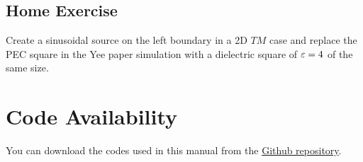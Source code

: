 \documentclass[11pt]{article}
\begin{document}
\subsection*{Home Exercise}

\begin{mdframed}[backgroundcolor=blue!20]
  Create a sinusoidal source on the left boundary in a 2D $TM$ case and replace the PEC square in the Yee paper simulation with a dielectric square of $\varepsilon = 4$ of the same size.
\end{mdframed}

\section{Code Availability}

You can download the codes used in this manual from the \href{https://github.com/hasantahir/HFCS-Labs}{Github repository}.



\end{document}
